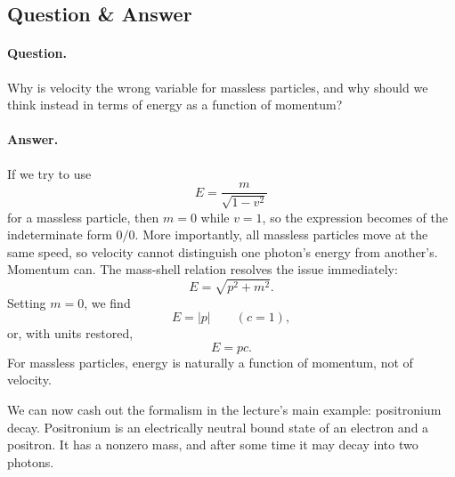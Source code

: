 \subsection{Question \& Answer}

\paragraph{Question.}
Why is velocity the wrong variable for massless particles, and why should we think instead in terms of energy as a function of momentum?

\paragraph{Answer.}
If we try to use
\begin{equation}
E=\frac{m}{\sqrt{1-v^2}}
\end{equation}
for a massless particle, then \(m=0\) while \(v=1\), so the expression becomes of the indeterminate form \(0/0\). More importantly, all massless particles move at the same speed, so velocity cannot distinguish one photon's energy from another's. Momentum can. The mass-shell relation resolves the issue immediately:
\begin{equation}
E=\sqrt{p^2+m^2}.
\end{equation}
Setting \(m=0\), we find
\begin{equation}
E=|p|
\qquad (c=1),
\end{equation}
or, with units restored,
\begin{equation}
E=pc.
\end{equation}
For massless particles, energy is naturally a function of momentum, not of velocity.
 
We can now cash out the formalism in the lecture's main example: positronium decay. Positronium is an electrically neutral bound state of an electron and a positron. It has a nonzero mass, and after some time it may decay into two photons.

